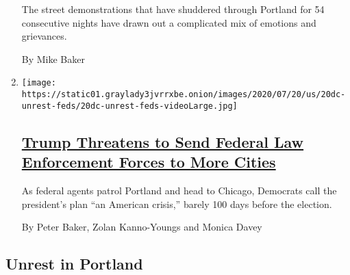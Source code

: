 \begin{enumerate}
  The street demonstrations that have shuddered through Portland for 54
  consecutive nights have drawn out a complicated mix of emotions and
  grievances.

  By Mike Baker
\item
  \texttt{[image: https://static01.graylady3jvrrxbe.onion/images/2020/07/20/us/20dc-unrest-feds/20dc-unrest-feds-videoLarge.jpg]}

  \hypertarget{trump-threatens-to-send-federal-law-enforcement-forces-to-more-cities}{%
  \subsection{\texorpdfstring{\href{/2020/07/20/us/politics/trump-chicago-portland-federal-agents.html}{Trump
  Threatens to Send Federal Law Enforcement Forces to More
  Cities}}{Trump Threatens to Send Federal Law Enforcement Forces to More Cities}}\label{trump-threatens-to-send-federal-law-enforcement-forces-to-more-cities}}

  As federal agents patrol Portland and head to Chicago, Democrats call
  the president's plan ``an American crisis,'' barely 100 days before
  the election.

  By Peter Baker, Zolan Kanno-Youngs and Monica Davey
\end{enumerate}

\hypertarget{unrest-in-portland}{%
\subsection{Unrest in Portland}\label{unrest-in-portland}}


